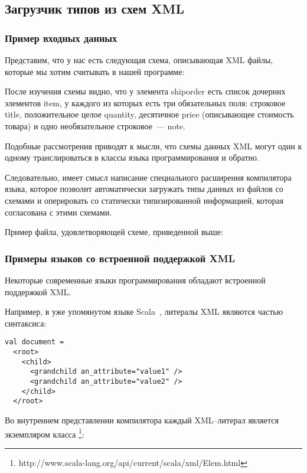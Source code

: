 \subsection{Загрузчик типов из схем XML}\label{xml-loader}


\subsubsection{Пример входных данных}

Представим, что у нас есть следующая схема, описывающая XML файлы, которые мы хотим считывать в нашей программе:
\begin{code}

\end{code}

После изучения схемы видно, что у элемента shiporder есть список дочерних элементов item, у каждого из которых есть три обязательных поля: строковое title, положительное целое quantity, десятичное price (описывающее стоимость товара) и одно необязательное строковое~--- note.

Подобные рассмотрения приводят к мысли, что схемы данных XML могут один к одному транслироваться в классы языка программирования и обратно.

Следовательно, имеет смысл написание специального расширения компилятора языка, которое позволит автоматически загружать типы данных из файлов со схемами и оперировать со статически типизированной информацией, которая согласована с этими схемами.

Пример файла, удовлетворяющей схеме, приведенной выше:
\begin{code}

\end{code}

\subsubsection{Примеры языков со встроенной поддержкой XML}
Некоторые современные языки программирования обладают встроенной поддержкой XML.

Например, в уже упомянутом языке Scala~\cite{scala-spec}, литералы XML являются частью синтаксиса:

\begin{code}\begin{lstlisting}[caption={Пример использования литералов XML в языке Scala.}, label=scala-xml-example]
val document =
  <root>
    <child>
      <grandchild an_attribute="value1" />
      <grandchild an_attribute="value2" />
    </child>
  </root>
\end{lstlisting}\end{code}
Во внутреннем представлении компилятора каждый XML--литерал является экземпляром класса \footnote{http://www.scala-lang.org/api/current/scala/xml/Elem.html}:

